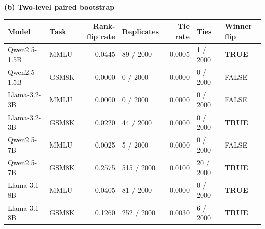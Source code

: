 \begin{table}[!tp]
\smallskip
\textbf{(b) Two-level paired bootstrap}\par\smallskip
\setlength{\tabcolsep}{2pt}\footnotesize
\begin{tabular}{llrlrll}
\toprule
Model & Task & Rank-flip rate & Replicates & Tie rate & Ties & Winner flip \\
\midrule
Qwen2.5-1.5B & MMLU  & 0.0445 & 89 / 2000  & 0.0005 & 1 / 2000  & \textbf{TRUE} \\
Qwen2.5-1.5B & GSM8K & 0.0000 & 0 / 2000   & 0.0000 & 0 / 2000  & FALSE \\
Llama-3.2-3B & MMLU  & 0.0000 & 0 / 2000   & 0.0000 & 0 / 2000  & FALSE \\
Llama-3.2-3B & GSM8K & 0.0220 & 44 / 2000  & 0.0000 & 0 / 2000  & \textbf{TRUE} \\
Qwen2.5-7B   & MMLU  & 0.0025 & 5 / 2000   & 0.0000 & 0 / 2000  & FALSE \\
Qwen2.5-7B   & GSM8K & 0.2575 & 515 / 2000 & 0.0100 & 20 / 2000 & \textbf{TRUE} \\
Llama-3.1-8B & MMLU  & 0.0405 & 81 / 2000  & 0.0000 & 0 / 2000  & \textbf{TRUE} \\
Llama-3.1-8B & GSM8K & 0.1260 & 252 / 2000 & 0.0030 & 6 / 2000  & \textbf{TRUE} \\
\bottomrule
\end{tabular}


\end{table}
